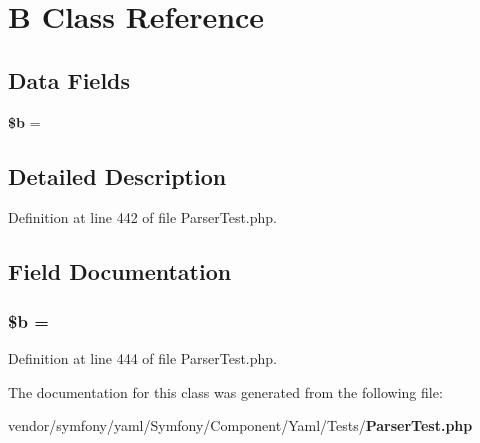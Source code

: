 \section{B Class Reference}
\label{class_symfony_1_1_component_1_1_yaml_1_1_tests_1_1_b}
\subsection*{Data Fields}
\begin{DoxyCompactItemize}
\item 
{\bf \$b} = \textquotesingle{}
\end{DoxyCompactItemize}


\subsection{Detailed Description}


Definition at line 442 of file Parser\+Test.\+php.



\subsection{Field Documentation}
\subsubsection[{\$b}]{\setlength{\rightskip}{0pt plus 5cm}\${\bf b} = \textquotesingle{}}\label{class_symfony_1_1_component_1_1_yaml_1_1_tests_1_1_b_ab9eb087b791749ae45deabb0899b7ccc}


Definition at line 444 of file Parser\+Test.\+php.



The documentation for this class was generated from the following file\+:\begin{DoxyCompactItemize}
\item 
vendor/symfony/yaml/\+Symfony/\+Component/\+Yaml/\+Tests/{\bf Parser\+Test.\+php}\end{DoxyCompactItemize}
